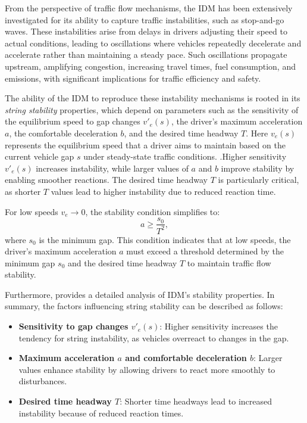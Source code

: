 \documentclass[a4paper,fleqn]{cas-sc}
\begin{document}
From the perspective of traffic flow mechanisms, the IDM has been extensively investigated for its ability to capture traffic instabilities, such as stop-and-go waves. These instabilities arise from delays in drivers adjusting their speed to actual conditions, leading to oscillations where vehicles repeatedly decelerate and accelerate rather than maintaining a steady pace. Such oscillations propagate upstream, amplifying congestion, increasing travel times, fuel consumption, and emissions, with significant implications for traffic efficiency and safety.

The ability of the IDM to reproduce these instability mechanisms is rooted in its \textit{string stability} properties, which depend on parameters such as the sensitivity of the equilibrium speed to gap changes $v'_e(s)$, the driver's maximum acceleration $a$, the comfortable deceleration $b$, and the desired time headway $T$. Here $v_e(s)$ represents the equilibrium speed that a driver aims to maintain based on the current vehicle gap $s$ under steady-state traffic conditions.  .Higher sensitivity $v'_e(s)$ increases instability, while larger values of $a$ and $b$ improve stability by enabling smoother reactions. The desired time headway $T$ is particularly critical, as shorter $T$ values lead to higher instability due to reduced reaction time.

For low speeds $v_e \to 0$, the stability condition simplifies to:
\begin{equation}
    a \geq \frac{s_0}{T^2},
\end{equation}
where $s_0$ is the minimum gap. This condition indicates that at low speeds, the driver's maximum acceleration $a$ must exceed a threshold determined by the minimum gap $s_0$ and the desired time headway $T$ to maintain traffic flow stability.

Furthermore, \cite{treiberTrafficFlowDynamics2013} provides a detailed analysis of IDM's stability properties. In summary, the factors influencing string stability can be described as follows:
\begin{itemize}
    \item \textbf{Sensitivity to gap changes $v'_e(s)$}: Higher sensitivity increases the tendency for string instability, as vehicles overreact to changes in the gap.
    \item \textbf{Maximum acceleration $a$ and comfortable deceleration $b$}: Larger values enhance stability by allowing drivers to react more smoothly to disturbances.
    \item \textbf{Desired time headway $T$}: Shorter time headways lead to increased instability because of reduced reaction times.
\end{itemize}
\end{document}
